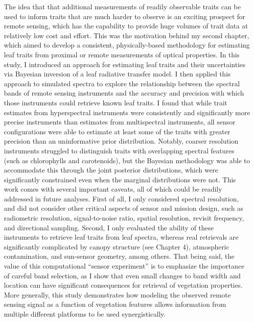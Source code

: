 The idea that that additional measurements of readily observable traits can be used to inform traits that are much harder to observe is an exciting prospect for remote sensing, which has the capability to provide huge volumes of trait data at relatively low cost and effort.
This was the motivation behind my second chapter, which aimed to develop a consistent, physically-based methodology for estimating leaf traits from proximal or remote measurements of optical properties.
In this study, I introduced an approach for estimating leaf traits and their uncertainties via Bayesian inversion of a leaf radiative transfer model.
I then applied this approach to simulated spectra to explore the relationship between the spectral bands of remote sensing instruments and the accuracy and precision with which those instruments could retrieve known leaf traits.
I found that while trait estimates from hyperspectral instruments were consistently and significantly more precise instruments than estimates from multispectral instruments, all sensor configurations were able to estimate at least some of the traits with greater precision than an uninformative prior distribution.
Notably, coarser resolution instruments struggled to distinguish traits with overlapping spectral features (such as chlorophylls and carotenoids), but the Bayesian methodology was able to accommodate this through the joint posterior distributions, which were significantly constrained even when the marginal distributions were not.
This work comes with several important caveats, all of which could be readily addressed in future analyses.
First of all, I only considered spectral resolution, and did not consider other critical aspects of sensor and mission design, such as radiometric resolution, signal-to-noise ratio, spatial resolution, revisit frequency, and directional sampling.
Second, I only evaluated the ability of these instruments to retrieve leaf traits from leaf spectra, whereas real retrievals are significantly complicated by canopy structure (see Chapter 4), atmospheric contamination, and sun-sensor geometry, among others.
That being said, the value of this computational ``sensor experiment'' is to emphasize the importance of careful band selection, as I show that even small changes to band width and location can have significant consequences for retrieval of vegetation properties.
More generally, this study demonstrates how modeling the observed remote sensing signal as a function of vegetation features allows information from multiple different platforms to be used synergistically.

